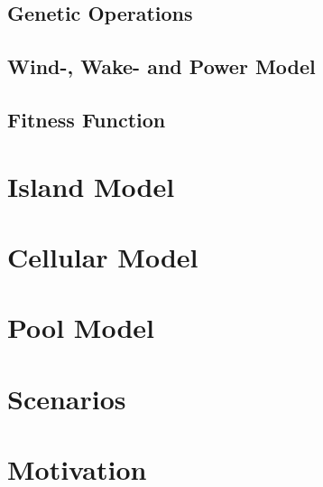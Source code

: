 \documentclass{article}
\begin{document}
\subsection{Genetic Operations}\label{subsection:genetic operations}


\subsection{Wind-, Wake- and Power Model}\label{subsection:wind-, wake- and power model}


\subsection{Fitness Function}\label{subsection:fitness function}


\section{Island Model}\label{section:island model}


\section{Cellular Model}\label{section:cellular model}


\section{Pool Model}\label{section:pool model}


\section{Scenarios}\label{section:scenarios}


\section{Motivation}\label{section:motivation}
\end{document}
